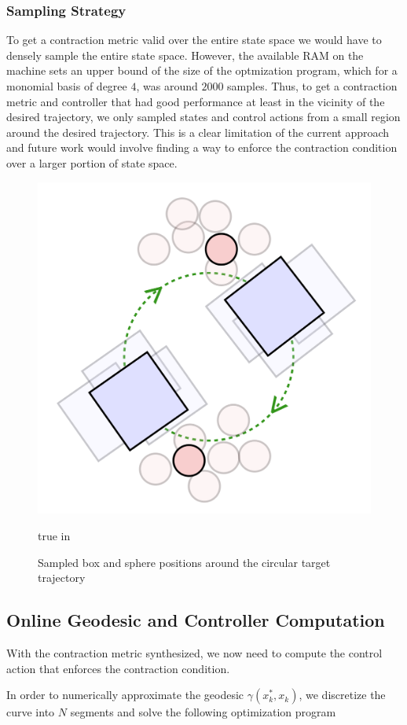 \documentclass[journal]{IEEEtran}
\begin{document}
\subsubsection{Sampling Strategy}
To get a contraction metric valid over the entire state space we would have to densely sample the entire state space. However, the available RAM on the machine sets an upper bound of the size of the optmization program, which for a monomial basis of degree $4$, was around $2000$ samples. Thus, to get a contraction metric and controller that had good performance at least in the vicinity of the desired trajectory, we only sampled states and control actions from a small region around the desired trajectory. This is a clear limitation of the current approach and future work would involve finding a way to enforce the contraction condition over a larger portion of state space.

\begin{figure}[h]
	\centering\includegraphics[width = 0.3 \textwidth]
	{figures/sampling_strategy.png}
    \caption{Sampled box and sphere positions around the circular target trajectory}
	\label{fig:sampling_strategy}
	 true in
\end{figure}


\subsection{Online Geodesic and Controller Computation}
With the contraction metric synthesized, we now need to compute the control action that enforces the contraction condition.

In order to numerically approximate the geodesic $\gamma(x^*_k, x_k)$, we discretize the curve into $N$ segments and solve the following optimization program
\end{document}
